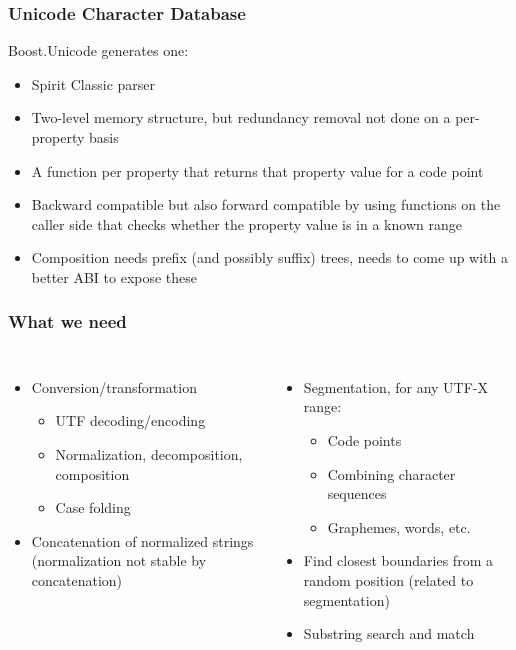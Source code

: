 \documentclass{beamer}
\begin{document}
\begin{frame}
	\frametitle{Unicode Character Database}
	
	Boost.Unicode generates one:
	\begin{itemize}
		\item Spirit Classic parser
		\item Two-level memory structure, but redundancy removal not done on a per-property basis
		\item A function per property that returns that property value for a code point
		\item Backward compatible but also forward compatible by using functions on the caller side that checks
		      whether the property value is in a known range
		\item Composition needs prefix (and possibly suffix) trees, needs to come up with a better ABI to expose these
	\end{itemize}
	
\end{frame}

\begin{frame}
	\frametitle{What we need}
	
	\begin{columns}[t]
	
	
	\begin{itemize}
	
	\item Conversion/transformation
	\begin{itemize}
		\item UTF decoding/encoding
		\item Normalization, decomposition, composition
		\item Case folding
	\end{itemize}
	
	\item Concatenation of normalized strings (normalization not stable by concatenation)	
	
	\end{itemize}
	
	\begin{itemize}
	\item Segmentation, for any UTF-X range:
	\begin{itemize}
		\item Code points
		\item Combining character sequences
		\item Graphemes, words, etc.
	\end{itemize}	
	
	\item Find closest boundaries from a random position (related to segmentation)
	\item Substring search and match
	
	\end{itemize}
	
	\end{columns}
		
\end{frame}
\end{document}
